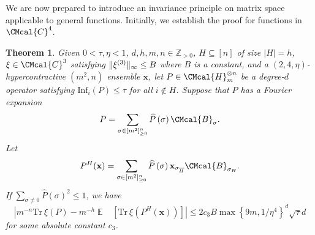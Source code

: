 \documentclass[11pt]{article}
\def\B{\CMcal{B}}
\def\C{\CMcal{C}}
\def\H{\CMcal{H}}
\theoremstyle{plain}
\newtheorem{theorem}{Theorem}[section]
\theoremstyle{definition}
\newcommand {\minusspace} {\: \! \!}
\newcommand {\Fn} [2] {\ensuremath{ #1 \minusspace \Br{ #2 } }}
\newcommand {\set} [1] {\ensuremath{ \left\lbrace #1 \right\rbrace }}
\newcommand {\br} [1] {\ensuremath{ \left( #1 \right) }}
\newcommand {\Br} [1] {\ensuremath{ \left[ #1 \right] }}
\DeclarePairedDelimiter{\norm}{\lVert}{\rVert}
\newcommand {\ab} [1] {\ensuremath{ \left| #1 \right| }}
\DeclareMathOperator*{\bigE}{\mathbb{E}}
\newcommand {\expec} [2] {\Fn{\bigE_{\substack{#1}}}{#2}}
\newcommand {\Tr} {\ensuremath{ \mathrm{Tr} }}
\newcommand{\posint}{{\mathbb Z}_{>0}}
\newcommand{\randx}{\ensuremath{\mathbf{x}}}
\newcommand{\infi}[1]{\ensuremath{\mathrm{Inf}_i}\br{#1}}
\newcommand{\sigmarange}[1]{\ensuremath{\sigma\in[m^2]_{\geq0}^{#1}}}
\newcommand{\1}{\mathbb{1}} %
\begin{document}
We are now prepared to introduce an invariance principle on matrix space applicable to general functions. Initially, we establish the proof for functions in $\C^{4}$.
\begin{theorem}\label{lem:generalinvariance}
	Given $0<\tau,\eta<1$, $d,h,m,n\in\posint$, $H\subseteq[n]$ of size $\ab{H}=h$, $\xi\in\C^{3}$ satisfying $\norm{\xi^{(3)}}_\infty\leq B$ where $B$ is a constant, and a $(2,4,\eta)$-hypercontractive  $(m^2,n)$ ensemble $\randx$, let $P\in\H_m^{\otimes n}$ be a degree-$d$ operator satisfying $\infi{P}\leq\tau$ for all $i\notin H$. Suppose that $P$ has a Fourier expansion
	\[P=\sum_{\sigmarange{n}}\widehat{P}\br{\sigma}\B_\sigma.\]
	Let 
	\[P^H(\randx)=\sum_{\sigmarange{n}}\widehat{P}\br{\sigma}\randx_{\sigma_{\overline{H}}}\B_{\sigma_H}.\]
	If $\sum_{\sigma\ne0}\widehat{P}\br{\sigma}^2\leq1$, we have
	\[\ab{m^{-n}\Tr~\xi\br{P}-m^{-h}\expec{}{\Tr~\xi\br{P^H(\randx)}}}\leq 2c_3B \max\set{9m,1/\eta^4}^d\sqrt{\tau}d\]
	for some absolute constant $c_3$.
\end{theorem}
\end{document}
